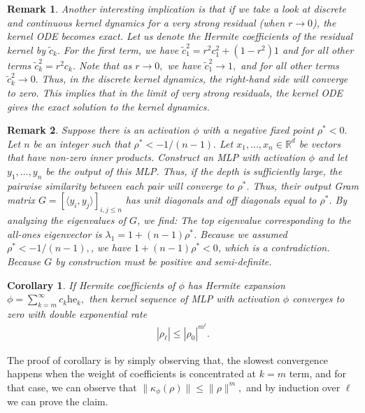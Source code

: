 \documentclass[twoside]{article}
\newcommand{\km}{\kappa_\phi}
\newcommand{\R}{\mathbb{R}}
\newcommand{\he}{\mathrm{he}}
\newtheorem{remark}{Remark}
\newtheorem{corollary}{Corollary}
\theoremstyle{definition}
\begin{document}
\begin{remark}\label{rem:residual_ODE}
    Another interesting implication is that if we take a look at discrete and continuous kernel dynamics for a very strong residual (when $r\to 0$), the kernel ODE becomes exact. Let us denote the Hermite coefficients of the residual kernel by $\tilde{c}_k.$ For the first term, we have $\tilde{c}_1^2 = r^2 c_1^2 + (1-r^2) 1$ and for all other terms $\tilde{c}_k^2 = r^2 c_k$. Note that as $r \to 0,$ we have $\tilde{c}_1^2\to 1,$ and for all other terms $\tilde{c}_k^2\to 0.$ Thus, in the discrete kernel dynamics, the right-hand side will converge to zero. This implies that in the limit of very strong residuals, the kernel ODE gives the exact solution to the kernel dynamics. 
\end{remark}

\begin{remark}\label{rem:no_negative_geometric}
    Suppose there is an activation $\phi$ with a negative fixed point $\rho^*<0.$ Let $n$ be an integer such that $\rho^* < -1/(n-1).$ Let $x_1,\dots, x_n\in \R^d$ be vectors that have non-zero inner products. Construct an MLP with activation $\phi$ and let $y_1,\dots, y_n$ be the output of this MLP. Thus, if the depth is sufficiently large, the pairwise similarity between each pair will converge to $\rho^*.$ Thus, their output Gram matrix $G = [\langle y_i,y_j\rangle]_{i,j\le n}$  has unit diagonals and off diagonals equal to $\rho^*.$ By analyzing the eigenvalues of $G$, we find: The top eigenvalue corresponding to the all-ones eigenvector is $\lambda_1 = 1 + (n-1)\rho^*$. Because we assumed $\rho^* < -1/(n-1),$, we have $1 + (n-1)\rho^* < 0$, which is a contradiction. Because $G$ by construction must be positive and semi-definite.  
\end{remark}

\begin{corollary}\label{cor:double_exp}
    If Hermite coefficients of $\phi$ has Hermite expansion $\phi = \sum_{k=m}^\infty c_k \he_k,$ then kernel sequence of MLP with activation $\phi$ converges to zero with double exponential rate 
    \begin{align*}
        |\rho_\ell| \le |\rho_0|^{m^\ell}.
    \end{align*}
\end{corollary}

The proof of corollary is by simply observing that, the slowest convergence happens when the weight of coefficients is concentrated at $k=m$ term, and for that case, we can observe that $\|\km(\rho)\|\le \|\rho\|^m,$ and by induction over $\ell$ we can prove the claim. 
\end{document}
